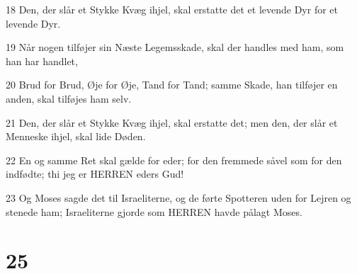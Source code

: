 \par 18 Den, der slår et Stykke Kvæg ihjel, skal erstatte det et levende Dyr for et levende Dyr.
\par 19 Når nogen tilføjer sin Næste Legemsskade, skal der handles med ham, som han har handlet,
\par 20 Brud for Brud, Øje for Øje, Tand for Tand; samme Skade, han tilføjer en anden, skal tilføjes ham selv.
\par 21 Den, der slår et Stykke Kvæg ihjel, skal erstatte det; men den, der slår et Menneske ihjel, skal lide Døden.
\par 22 En og samme Ret skal gælde for eder; for den fremmede såvel som for den indfødte; thi jeg er HERREN eders Gud!
\par 23 Og Moses sagde det til Israeliterne, og de førte Spotteren uden for Lejren og stenede ham; Israeliterne gjorde som HERREN havde pålagt Moses.

\chapter{25}

